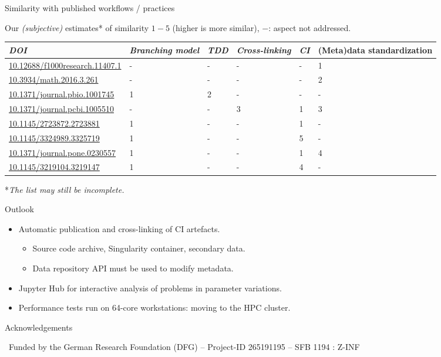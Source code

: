 \documentclass[
	ngerman,%
	aspectratio=169,%
	color={accentcolor=2d},
	logo=true,%
	colorframetitle=true,%
	]{tudabeamer}
\begin{document}
\begin{frame}{Similarity with published workflows / practices}

	\vfill
	Our \emph{(subjective)} estimates* of similarity $1-5$ (higher is more similar), $-$: aspect not addressed.
	\begin{center}
		\scriptsize
		\begin{tabular}{@{} *6l @{}}    \toprule
				\emph{DOI} & \emph{Branching model} & \emph{TDD} & \emph{Cross-linking} & \emph{CI}  & (Meta)data standardization \\\midrule
				 \href{https://doi.org/10.12688/f1000research.11407.1}{10.12688/f1000research.11407.1} 
					 & -  & -  & -  & - & 1  \\ 
				 \href{https://doi.org/10.3934/math.2016.3.261}{10.3934/math.2016.3.261} 
					 & -  & -  & -  & - & 2  \\ 
				 \href{https://doi.org/10.1371/journal.pbio.1001745}{10.1371/journal.pbio.1001745} 
					 & 1  & 2  & -  & - & -  \\ 
				 \href{https://doi.org/10.1371/journal.pcbi.1005510}{10.1371/journal.pcbi.1005510}
					 & -  & -  & 3 & 1 & 3  \\ 
				 \href{https://doi.org/10.1145/2723872.2723881}{10.1145/2723872.2723881}
					 & 1  & -  & - & 1 & -  \\ 
				 \href{https://dl.acm.org/doi/10.1145/3324989.3325719}{10.1145/3324989.3325719}
					 & 1  & -  & - & 5 & -  \\ 
				 \href{https://doi.org/10.1371/journal.pone.0230557}{10.1371/journal.pone.0230557}
					 & 1  & -  & - & 1 & 4  \\ 
				 \href{https://doi.org/10.1145/3219104.3219147}{10.1145/3219104.3219147} 
					 & 1  & -  & -  & 4 & - \\\bottomrule
				 \hline
		\end{tabular}
	\end{center}
	
	*\emph{The list may still be incomplete.}
	
\end{frame}

\begin{frame}{Outlook}
	\vfill
	\begin{itemize}
		\item Automatic publication and cross-linking of CI artefacts. 
			\begin{itemize}
				\item Source code archive, Singularity container, secondary data. 
				\item Data repository API must be used to modify metadata. 
			\end{itemize}
		\item Jupyter Hub for interactive analysis of problems in parameter variations.
		\item Performance tests run on 64-core workstations: moving to the HPC cluster. 
	\end{itemize}
\end{frame}

\begin{frame}{Acknowledgements}

	\vfill
	{\
		Funded by the German Research Foundation (DFG) – Project-ID 265191195 – SFB 1194 : Z-INF
	}

\end{frame}
\end{document}
